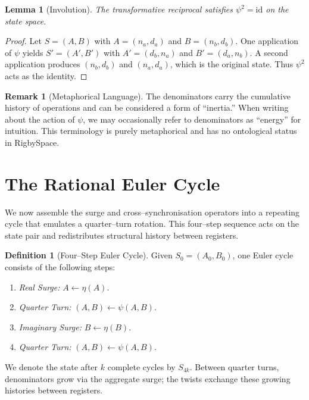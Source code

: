\documentclass[11pt, letterpaper]{article}
\newcommand{\aop}{\eta}
\newcommand{\psiop}{\psi}
\theoremstyle{definition}
\newtheorem{definition}{Definition}[section]
\newtheorem{remark}{Remark}[section]
\theoremstyle{plain}
\newtheorem{lemma}{Lemma}[section]
\begin{document}
\begin{lemma}[Involution]
The transformative reciprocal satisfies $\psiop^2 = \mathrm{id}$ on the
state space.
\end{lemma}

\begin{proof}
Let $S=(A,B)$ with $A=(n_a,d_a)$ and $B=(n_b,d_b)$.  One application of
$\psiop$ yields $S'=(A',B')$ with $A'=(d_b,n_a)$ and $B'=(d_a,n_b)$.  A
second application produces $(n_b,d_b)$ and $(n_a,d_a)$, which is the original
state.  Thus $\psiop^2$ acts as the identity.
\end{proof}

\begin{remark}[Metaphorical Language]
The denominators carry the cumulative history of operations and can be
considered a form of ``inertia.''  When writing about the action of
$\psiop$, we may occasionally refer to denominators as ``energy'' for
intuition.  This terminology is purely metaphorical and has no ontological
status in RigbySpace.
\end{remark}

\section{The Rational Euler Cycle}

We now assemble the surge and cross–synchronisation operators into a
repeating cycle that emulates a quarter–turn rotation.  This four–step
sequence acts on the state pair and redistributes structural history between
registers.

\begin{rsbox}
  \begin{definition}[Four–Step Euler Cycle]
  Given $S_0=(A_0,B_0)$, one Euler cycle consists of the following steps:
  \begin{enumerate}[label=\arabic*.]
    \item \emph{Real Surge:} $A \leftarrow \aop(A)$.
    \item \emph{Quarter Turn:} $(A,B) \leftarrow \psiop(A,B)$.
    \item \emph{Imaginary Surge:} $B \leftarrow \aop(B)$.
    \item \emph{Quarter Turn:} $(A,B) \leftarrow \psiop(A,B)$.
  \end{enumerate}
  We denote the state after $k$ complete cycles by $S_{4k}$.  Between
  quarter turns, denominators grow via the aggregate surge; the twists
  exchange these growing histories between registers.
  \end{definition}
\end{rsbox}
\end{document}
